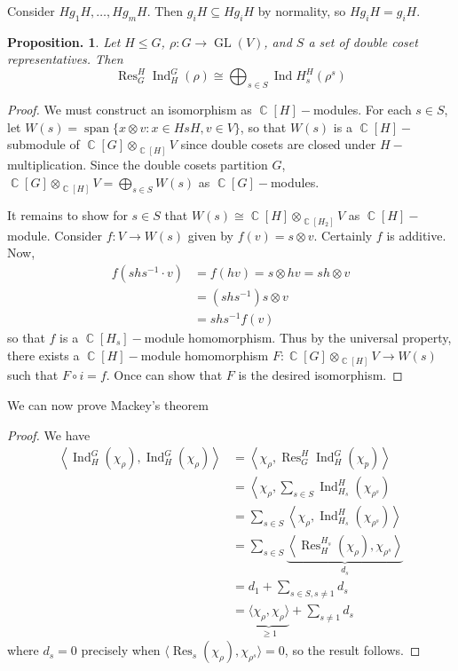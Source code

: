 \documentclass[11pt, a4paper]{memoir}
\DeclareMathOperator{\C}{{\mathbb{C}}}
\theoremstyle{change}
\newtheorem{proposition}[theorem]{Proposition.}
\theoremstyle{plain}
\theoremstyle{nonumberplain}
\newtheorem{proof}{Proof}
\DeclareMathOperator{\GL}{GL}
\DeclareMathOperator{\Res}{Res}
\DeclareMathOperator{\spn}{span}
\DeclareMathOperator{\Ind}{Ind}
\numberwithin{equation}{section}
\begin{document}
Consider $Hg_1H,\ldots,Hg_mH$.
Then $g_iH\subseteq Hg_iH$ by normality, so $Hg_iH=g_iH$.
\begin{proposition}
    Let $H\leq G$, $\rho:G\to\GL(V)$, and $S$ a set of double coset representatives.
    Then
    \begin{equation*}
        \Res_G^H\Ind_H^G(\rho)\cong\bigoplus_{s\in S}\Ind H_s^H(\rho^s)
    \end{equation*}
\end{proposition}
\begin{proof}
    We must construct an isomorphism as $\C[H]-$modules.
    For each $s\in S$, let $W(s)=\spn\{x\otimes v:x\in HsH,v\in V\}$, so that $W(s)$ is a $\C[H]-$submodule of $\C[G]\otimes_{\C[H]}V$ since double cosets are closed under $H-$multiplication.
    Since the double cosets partition $G$, $\C[G]\otimes_{\C[H]}V=\bigoplus_{s\in S}W(s)$ as $\C[G]-$modules.

    It remains to show for $s\in S$ that $W(s)\cong\C[H]\otimes_{\C[H_2]}V$ as $\C[H]-$module.
    Consider $f:V\to W(s)$ given by $f(v)=s\otimes v$.
    Certainly $f$ is additive.
    Now,
    \begin{align*}
        f(shs^{-1}\cdot v)&=f(hv)=s\otimes hv=sh\otimes v\\
                          &= (shs^{-1})s\otimes v\\
                          &= shs^{-1}f(v)
    \end{align*}
    so that $f$ is a $\C[H_s]-$module homomorphism.
    Thus by the universal property, there exists a $\C[H]-$module homomorphism $F:\C[G]\otimes_{\C[H]}V\to W(s)$ such that $F\circ i=f$.
    Once can show that $F$ is the desired isomorphism.
\end{proof}
We can now prove Mackey's theorem
\begin{proof}
    We have
    \begin{align*}
        \left\langle\Ind_H^G(\chi_\rho),\Ind_H^G(\chi_\rho)\right\rangle &= \left\langle\chi_\rho,\Res_G^H\Ind_H^G(\chi_p)\right\rangle\\
                                                                         &= \left\langle\chi_\rho,\sum_{s\in S}\Ind_{H_s}^H(\chi_{\rho^s})\\
                                                                         &= \sum_{s\in S}\left\langle\chi_\rho,\Ind_{H_s}^H(\chi_{\rho^s})\right\rangle\\
                                                                         &= \sum_{s\in S}\underbrace{\left\langle \Res_H^{H_s}(\chi_\rho),\chi_{\rho^s}\right\rangle}_{d_s}\\
                                                                         &= d_1+\sum_{s\in S,s\neq 1}d_s\\
                                                                         &= \underbrace{\langle\chi_\rho,\chi_\rho\rangle}_{\geq 1}+\sum_{s\neq 1}d_s
    \end{align*}
    where $d_s=0$ precisely when $\langle\Res_s(\chi_\rho),\chi_{\rho^s}\rangle=0$, so the result follows.
\end{proof}
\end{document}
